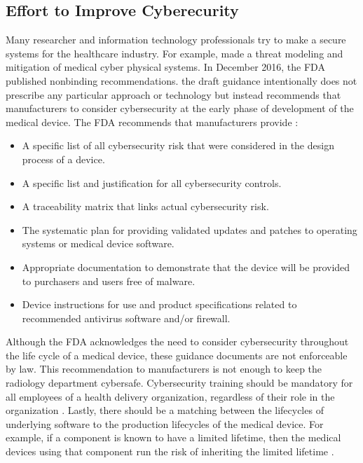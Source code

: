 \documentclass[pdf,bookmarks,colorlinks=true]{IEEEtran}
\begin{document}
\subsection{Effort to Improve Cyberecurity}
Many researcher and information technology professionals try to make a secure systems for the healthcare industry. For example, \cite{Almohri:2017:TMM:3204094.3204113} made a threat modeling and mitigation of medical cyber physical systems. In December 2016, the FDA published nonbinding recommendations. the draft guidance intentionally does not prescribe any particular approach or technology but instead recommends that manufacturers to consider cybersecurity at the early phase of development of the medical device. The FDA recommends that manufacturers provide \cite{fu2014controlling}: 
\begin{itemize}
	\item A specific list of all cybersecurity risk that were considered in the design process of a device.
	\item A specific list and justification for all cybersecurity controls.
	\item A traceability matrix that links actual cybersecurity risk.
	\item The systematic plan for providing validated updates and patches to operating systems or medical device software.
	\item Appropriate documentation to demonstrate that the device will be provided to purchasers and users free of malware.
	\item Device instructions for use and product specifications related to recommended antivirus software and/or firewall. 
\end{itemize}
Although the FDA acknowledges the need to consider cybersecurity throughout the life cycle of a medical device, these guidance documents are not enforceable by law. This recommendation to manufacturers is not enough to keep the radiology department cybersafe. Cybersecurity training should be mandatory for all employees of a health delivery organization, regardless of their role in the organization \cite{ferrara2019cybersecurity}. Lastly, there should be a matching between the lifecycles of underlying software to the production lifecycles of the medical device. For example, if a component is known to have a limited lifetime, then the medical devices using that component run the risk of inheriting the limited lifetime \cite{fu2014controlling}.
\end{document}
